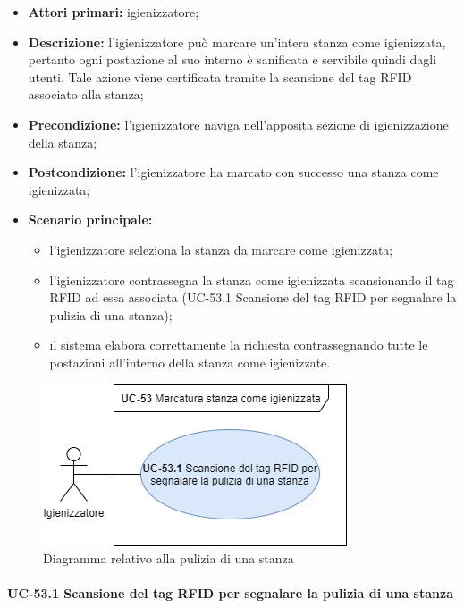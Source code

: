     \begin{itemize}
        \item \textbf{Attori primari:} igienizzatore;
        \item \textbf{Descrizione:} l’igienizzatore può marcare un'intera stanza come igienizzata, pertanto ogni postazione al suo interno è sanificata e servibile quindi dagli utenti. Tale azione viene certificata tramite la scansione del tag RFID associato alla stanza;
        \item \textbf{Precondizione:} l'igienizzatore naviga nell’apposita sezione di igienizzazione della stanza; 
        \item \textbf{Postcondizione:} l'igienizzatore ha marcato con successo una stanza come igienizzata;
        \item \textbf{Scenario principale:} 
            \begin{itemize}
                \item l'igienizzatore seleziona la stanza da marcare come igienizzata;	
                \item l'igienizzatore contrassegna la stanza come igienizzata scansionando il tag RFID ad essa associata (UC-53.1 Scansione del tag RFID per segnalare la pulizia di una stanza);
                \item il sistema elabora correttamente la richiesta contrassegnando tutte le postazioni all'interno della stanza come igienizzate.
            \end{itemize}
    \end{itemize}

\begin{figure}[H]
    \centering
        \includegraphics[scale=0.50]{src/CasiDUso/immagini/StanzaIgienizzata.png}
            \caption{Diagramma relativo alla pulizia di una stanza}
    \end{figure}
    

\paragraph{UC-53.1 Scansione del tag RFID per segnalare la pulizia di una stanza}

